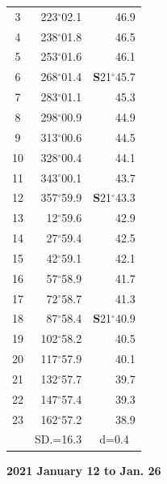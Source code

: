 \documentclass[10pt, a4paper]{report}
\begin{document}
\begin{scriptsize}
\begin{tabular*}{0.2\textwidth}[t]{@{\extracolsep{\fill}}|c|rr|}
3 & 223$^\circ$02.1 & \raisebox{0.24ex}{\boldmath$\cdot$~\boldmath$\cdot$~~}46.9\\
4 & 238$^\circ$01.8 & 46.5\\
5 & 253$^\circ$01.6 & 46.1\\[2Pt]
6 & 268$^\circ$01.4 & \textbf{S}21$^\circ$45.7\\
7 & 283$^\circ$01.1 & 45.3\\
8 & 298$^\circ$00.9 & 44.9\\
9 & 313$^\circ$00.6 & \raisebox{0.24ex}{\boldmath$\cdot$~\boldmath$\cdot$~~}44.5\\
10 & 328$^\circ$00.4 & 44.1\\
11 & 343$^\circ$00.1 & 43.7\\[2Pt]
12 & 357$^\circ$59.9 & \textbf{S}21$^\circ$43.3\\
13 & 12$^\circ$59.6 & 42.9\\
14 & 27$^\circ$59.4 & 42.5\\
15 & 42$^\circ$59.1 & \raisebox{0.24ex}{\boldmath$\cdot$~\boldmath$\cdot$~~}42.1\\
16 & 57$^\circ$58.9 & 41.7\\
17 & 72$^\circ$58.7 & 41.3\\[2Pt]
18 & 87$^\circ$58.4 & \textbf{S}21$^\circ$40.9\\
19 & 102$^\circ$58.2 & 40.5\\
20 & 117$^\circ$57.9 & 40.1\\
21 & 132$^\circ$57.7 & \raisebox{0.24ex}{\boldmath$\cdot$~\boldmath$\cdot$~~}39.7\\
22 & 147$^\circ$57.4 & 39.3\\
23 & 162$^\circ$57.2 & 38.9\\
\hline
\rule{0pt}{2.4ex} & \multicolumn{1}{c}{SD.=16.3} & \multicolumn{1}{c|}{d=0.4}\\
\hline
\end{tabular*}

\end{scriptsize}
\newpage
\sffamily
\noindent
\begin{flushright}
\textbf{2021 January 12 to Jan. 26}\par
\end{flushright}
\end{document}
